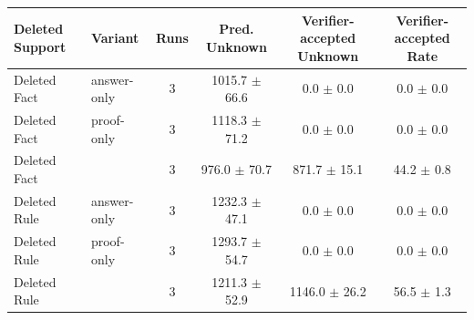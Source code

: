 \begin{tabular}{llcccc}
\toprule
Deleted Support & Variant & Runs & Pred. Unknown & Verifier-accepted Unknown & Verifier-accepted Rate \\
\midrule
Deleted Fact & answer-only & 3 & 1015.7 $\pm$ 66.6 & 0.0 $\pm$ 0.0 & 0.0 $\pm$ 0.0 \\
Deleted Fact & proof-only & 3 & 1118.3 $\pm$ 71.2 & 0.0 $\pm$ 0.0 & 0.0 $\pm$ 0.0 \\
Deleted Fact & \model{} & 3 & 976.0 $\pm$ 70.7 & 871.7 $\pm$ 15.1 & 44.2 $\pm$ 0.8 \\
\midrule
Deleted Rule & answer-only & 3 & 1232.3 $\pm$ 47.1 & 0.0 $\pm$ 0.0 & 0.0 $\pm$ 0.0 \\
Deleted Rule & proof-only & 3 & 1293.7 $\pm$ 54.7 & 0.0 $\pm$ 0.0 & 0.0 $\pm$ 0.0 \\
Deleted Rule & \model{} & 3 & 1211.3 $\pm$ 52.9 & 1146.0 $\pm$ 26.2 & 56.5 $\pm$ 1.3 \\
\bottomrule
\end{tabular}